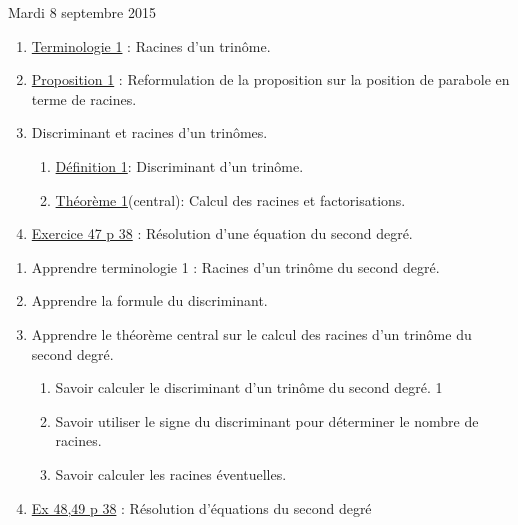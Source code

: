\documentclass[a4paper,11pt]{article}
\theoremstyle{break}
\begin{document}
  
  Mardi 8 septembre 2015
  \begin{enumerate}   
    \item 
    \href{https://github.com/mathlorgues/math1sd1516/blob/master/20150907/definitions.pdf}
    {Terminologie 1} : Racines d'un trinôme.
    \item 
    \href{https://github.com/mathlorgues/math1sd1516/blob/master/20150908/propositions.pdf}
    {Proposition 1} : Reformulation de la proposition sur la position de parabole en terme de racines.
    \item Discriminant et racines d'un trinômes.
    \begin{enumerate}
      \item 
      \href{https://github.com/mathlorgues/math1sd1516/blob/master/20150908/definitions.pdf}
      {Définition 1}: Discriminant d'un trinôme.
      
      \item 
      \href{https://github.com/mathlorgues/math1sd1516/blob/master/20150908/propositions.pdf}
      {Théorème 1}(central): Calcul des racines et factorisations.
    \end{enumerate}
    \item 
    \href{https://github.com/mathlorgues/math1sd1516/blob/master/images/47-52p38.png}
    {Exercice 47 p 38} : Résolution d'une équation du second degré.
    
    
    
  \end{enumerate}
  
  \begin{Dev}
    
    \begin{enumerate}
      
      \item Apprendre terminologie 1 : Racines d'un trinôme du second degré.
      \item Apprendre la formule du discriminant.
      \item Apprendre le théorème central sur le calcul des racines 
      d'un trinôme du second degré.
      \begin{enumerate}
	\item Savoir calculer le discriminant d'un trinôme du second degré. 1
	\item Savoir utiliser le signe du discriminant pour déterminer
	le nombre de racines.
	\item Savoir calculer les racines éventuelles.
      \end{enumerate}
      \item  
      \href{https://github.com/mathlorgues/math1sd1516/blob/master/images/47-52p38.png}
      {Ex 48,49 p 38} : 
      Résolution d'équations du second degré
      
      
    \end{enumerate}
  \end{Dev}
  \newpage
  
\end{document}
